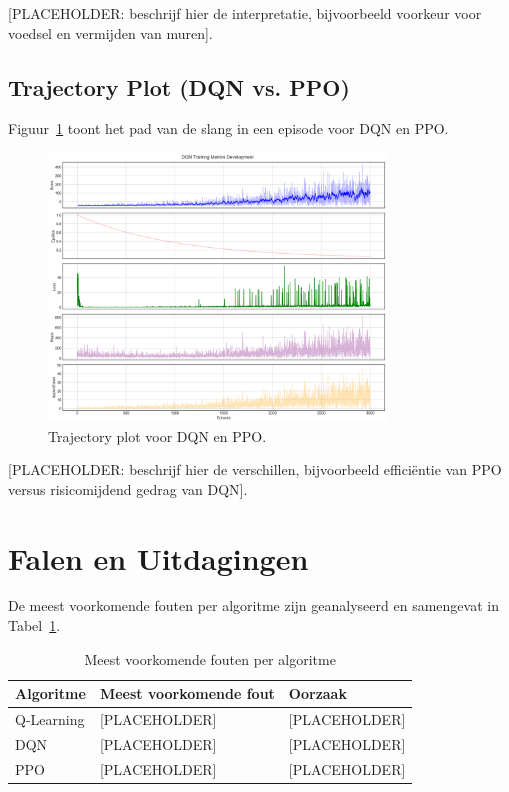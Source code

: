 \documentclass[a4paper,11pt]{report}
\begin{document}
[PLACEHOLDER: beschrijf hier de interpretatie, bijvoorbeeld voorkeur voor voedsel en vermijden van muren].

\subsection{Trajectory Plot (DQN vs. PPO)}
Figuur~\ref{fig:trajectory} toont het pad van de slang in een episode voor DQN
en PPO.

\begin{figure}[ht]
    \centering
    \includegraphics[width=0.8\textwidth]{../Experimenten/Experiment1Snake/DQN/dqn_analysis.png}
    \caption{Trajectory plot voor DQN en PPO.}
    \label{fig:trajectory}
\end{figure}

[PLACEHOLDER: beschrijf hier de verschillen, bijvoorbeeld efficiëntie van PPO versus risicomijdend gedrag van DQN].

\section{Falen en Uitdagingen}
De meest voorkomende fouten per algoritme zijn geanalyseerd en samengevat in
Tabel~\ref{tab:fouten}.

\begin{table}[ht]
    \centering
    \caption{Meest voorkomende fouten per algoritme}
    \label{tab:fouten}
    \begin{tabular}{|l|l|l|}
        \hline
        \textbf{Algoritme} & \textbf{Meest voorkomende fout} & \textbf{Oorzaak} \\ \hline
        Q-Learning         & [PLACEHOLDER]                   & [PLACEHOLDER]    \\ \hline
        DQN                & [PLACEHOLDER]                   & [PLACEHOLDER]    \\ \hline
        PPO                & [PLACEHOLDER]                   & [PLACEHOLDER]    \\ \hline
    \end{tabular}
\end{table}
\end{document}
